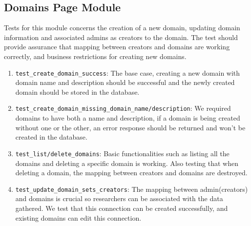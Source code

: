\documentclass[12pt, titlepage]{article}
\begin{document}
\subsection{Domains Page Module}
  Tests for this module concerns the creation of a new domain, updating domain information and associated admins as creators to the domain. The test should provide assurance that mapping between creators and domains are working correctly, and business restrictions for creating new domains.
  \begin{enumerate}
    \item \texttt{test\_create\_domain\_success}: The base case, creating a new domain with domain name and description should be successful and the newly created domain should be stored in the database.
    \item \texttt{test\_create\_domain\_missing\_domain\_name/description}: We required domains to have both a name and description, if a domain is being created without one or the other, an error response should be returned and won't be created in the database.
    \item \texttt{test\_list/delete\_domains}: Basic functionalities such as listing all the domains and deleting a specific domain is working. Also testing that when deleting a domain, the mapping between creators and domains are destroyed.
    \item \texttt{test\_update\_domain\_sets\_creators}: The mapping between admin(creators) and domains is crucial so researchers can be associated with the data gathered. We test that this connection can be created successfully, and existing domains can edit this connection.
  \end{enumerate}
\end{document}
